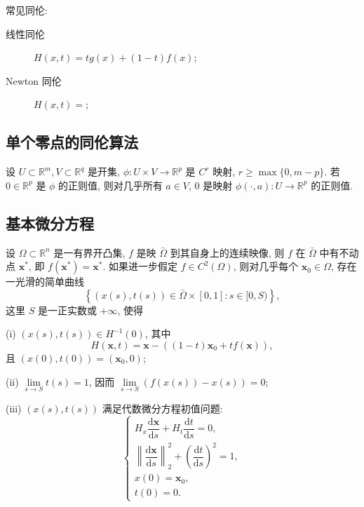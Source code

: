 常见同伦:
\begin{description}
  \item[线性同伦] \(H(x,t)=tg(x)+(1-t)f(x)\);
  \item[Newton 同伦] \(H(x,t)=\);
\end{description}

\subsection{单个零点的同伦算法}

\begin{theorem}
  设 \(U\subset\mathbb{R}^m,V\subset\mathbb{R}^q\) 是开集, \(\phi:U\times V\to\mathbb{R}^p\) 是 \(C^r\) 映射, \(r\ge\max\lbrace 0,m-p\rbrace\). 若 \(0\in\mathbb{R}^p\) 是 \(\phi\) 的正则值, 则对几乎所有 \(a\in V\), \(0\) 是映射 \(\phi(\cdot,a):U\to\mathbb{R}^p\) 的正则值.
\end{theorem}

\subsection{基本微分方程}

\begin{theorem}
  设 \(\Omega\subset\mathbb{R}^n\) 是一有界开凸集, \(f\) 是映 \(\bar\Omega\) 到其自身上的连续映像, 则 \(f\) 在 \(\bar\Omega\) 中有不动点 \(\boldsymbol{x}^*\), 即 \(f \left(\boldsymbol{x}^*\right)=\boldsymbol{x}^*\). 如果进一步假定 \(f\in C^2(\Omega)\), 则对几乎每个 \(\boldsymbol{x}_0\in\Omega\), 存在一光滑的简单曲线
  \begin{equation*}
    \left\lbrace (x(s),t(s))\in\bar \Omega\times [0,1]: s\in[0,S)\right\rbrace,
  \end{equation*}
  这里 \(S\) 是一正实数或 \(+\infty\), 使得

  (i) \((x(s),t(s))\in H^{-1}(0)\), 其中
  \begin{equation*}
    H(\boldsymbol{x},t)=\boldsymbol{x}-((1-t)\boldsymbol{x}_0+tf(\boldsymbol{x})),
  \end{equation*}
  且 \((x(0),t(0))=(\boldsymbol{x}_0,0)\);

  (ii) \(\lim\limits_{s\to S} t(s)=1\), 因而 \(\lim\limits_{s\to S} (f(x(s))-x(s))=0\);

  (iii) \((x(s),t(s))\) 满足代数微分方程初值问题:
  \begin{equation}
    \begin{cases}
      H_x\dfrac{\mathrm{d} \boldsymbol{x}}{\mathrm{d} s}+H_t \dfrac{\mathrm{d} t}{\mathrm{d} s}=0, \\
      \left\lVert \dfrac{\mathrm{d} \boldsymbol{x}}{\mathrm{d} s}\right\rVert_2^2+\left(\dfrac{\mathrm{d} t}{\mathrm{d} s}\right)^2=1, \\
      x(0)=\boldsymbol{x}_0, \\
      t(0)=0.
    \end{cases}
    \label{eq:homotopy_basic_differential_equation}
  \end{equation}
\end{theorem}


